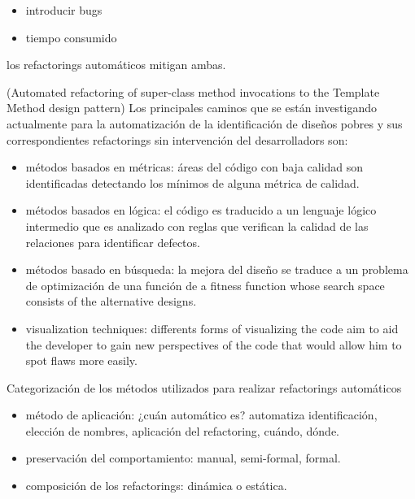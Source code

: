 \begin{itemize}
    \item introducir bugs
    \item tiempo consumido
\end{itemize}

los refactorings automáticos mitigan ambas.

(Automated refactoring of super-class method invocations to the Template Method design pattern) Los
principales caminos que se están investigando actualmente para la automatización de la
identificación de diseños pobres y sus correspondientes refactorings sin intervención del
desarrolladors son:

\begin{itemize}
    \item métodos basados en métricas: áreas del código con baja calidad son identificadas detectando
    los mínimos de alguna métrica de calidad.
    \item métodos basados en lógica: el código es traducido a un lenguaje lógico intermedio que es analizado
    con reglas que verifican la calidad de las relaciones para identificar defectos.
    \item métodos basado en búsqueda: la mejora del diseño se traduce a un problema de optimización de una función de 
    a fitness function whose search space consists of the alternative designs.
    \item visualization techniques: differents forms of visualizing the code aim to aid the
    developer to gain new perspectives of the code that would allow him to spot flaws more easily.
\end{itemize}

Categorización de los métodos utilizados para realizar refactorings automáticos

\begin{itemize}
    \item método de aplicación: ¿cuán automático es? automatiza identificación, elección de nombres, aplicación del refactoring, cuándo, dónde.
    \item preservación del comportamiento: manual, semi-formal, formal.
    \item composición de los refactorings: dinámica o estática.
\end{itemize}



